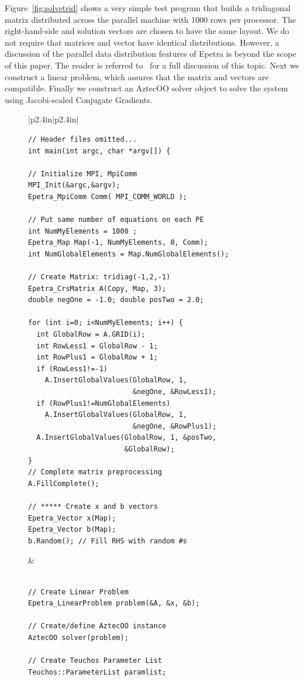 \documentclass[12pt,relax]{TPA}
\begin{document}
Figure~\ref{fig:solvetrid} shows a very simple test program that
builds a tridiagonal matrix distributed across the parallel machine
with 1000 rows per processor.  The right-hand-side and solution
vectors are chosen to have the same layout.  We do not require that
matrices and vector have identical distributions.  However, a
discussion of the parallel data distribution features of Epetra is
beyond the scope of this paper.  The reader is referred
to~\cite{Repartitioning} for a full discussion of this topic.
Next we construct a linear problem, which assures that the matrix and
vectors are compatible.  Finally we construct an AztecOO solver object
to solve the system using Jacobi-scaled Conjugate Gradients.
\begin{figure}
{\scriptsize
\begin{tabular}{|p{2.4in}|p{2.4in}|}\hline
\begin{verbatim}
// Header files omitted...
int main(int argc, char *argv[]) {

// Initialize MPI, MpiComm
MPI_Init(&argc,&argv);
Epetra_MpiComm Comm( MPI_COMM_WORLD );
                     
// Put same number of equations on each PE   
int NumMyElements = 1000 ;
Epetra_Map Map(-1, NumMyElements, 0, Comm);
int NumGlobalElements = Map.NumGlobalElements();

// Create Matrix: tridiag(-1,2,-1) 
Epetra_CrsMatrix A(Copy, Map, 3);
double negOne = -1.0; double posTwo = 2.0;

for (int i=0; i<NumMyElements; i++) {
  int GlobalRow = A.GRID(i); 
  int RowLess1 = GlobalRow - 1; 
  int RowPlus1 = GlobalRow + 1;
  if (RowLess1!=-1) 
    A.InsertGlobalValues(GlobalRow, 1, 
                         &negOne, &RowLess1);
  if (RowPlus1!=NumGlobalElements) 
    A.InsertGlobalValues(GlobalRow, 1, 
                         &negOne, &RowPlus1);
  A.InsertGlobalValues(GlobalRow, 1, &posTwo, 
                       &GlobalRow);
}
// Complete matrix preprocessing
A.FillComplete(); 

// ***** Create x and b vectors 
Epetra_Vector x(Map);
Epetra_Vector b(Map);
b.Random(); // Fill RHS with random #s
\end{verbatim}
&
\begin{verbatim}

// Create Linear Problem 
Epetra_LinearProblem problem(&A, &x, &b);  

// Create/define AztecOO instance 
AztecOO solver(problem);

// Create Teuchos Parameter List
Teuchos::ParameterList paramlist;


\end{verbatim}
\end{tabular}}
\end{figure}
\end{document}
